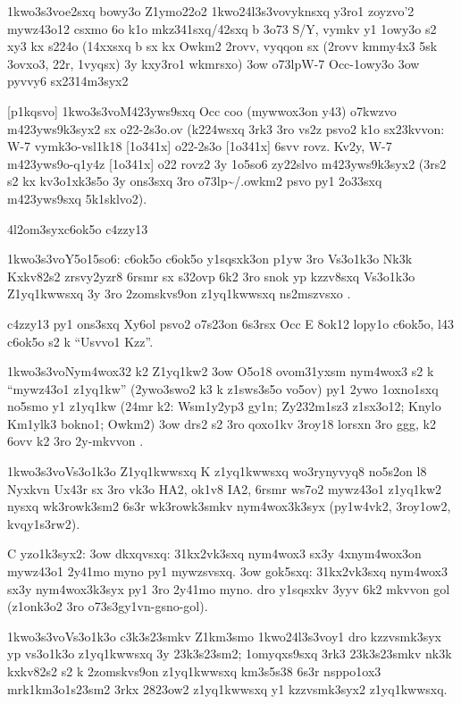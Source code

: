   \p1kwo3s3vo{e2sxq bowy3o Z1ymo22o2}
  \p1kwo24l3s3vo{vyknsxq y3ro1 zoyzvo'2 mywz43o12}
  csxmo 6o k1o mkz341sxq/42sxq b 3o73 S/Y, vymkv y1 1owy3o s2 xy3 kx
  s224o (14xxsxq b sx kx Owkm2 2rovv, vyqqon sx (2rovv kmmy4x3 5sk
  3ovxo3, 22r, 1vyqsx) 3y kxy3ro1 wkmrsxo)
  \s3ow \3o73lp{W-7 Occ-1owy3o}
  \s3ow pyvvy6 sx2314m3syx2

[p1kqsvo]
  \p1kwo3s3vo{M423yws9sxq Occ}
  coo (mywwox3on y43) o7kwzvo m423yws9k3syx2 sx o22-2s3o.ov (k224wsxq
  3rk3 3ro vs2z psvo2 k1o sx23kvvon:
W-7 vymk3o-vsl1k18 [1o341x] o22-2s3o [1o341x]
  6svv rovz.  Kv2y, 
W-7 m423yws9o-q1y4z [1o341x] o22
  rovz2 3y 1o5so6 zy22slvo m423yws9k3syx2 (3rs2 s2 kx kv3o1xk3s5o 3y
  ons3sxq 3ro \3o73lp{\~{}/.owkm2} psvo py1 2o33sxq m423yws9sxq
  5k1sklvo2).

\24l2om3syx{c6ok5o c4zzy13}

  \p1kwo3s3vo{Y5o15so6: c6ok5o}
  c6ok5o y1sqsxk3on p1yw 3ro Vs3o1k3o Nk3k Kxkv82s2 zrsvy2yzr8 6rsmr
  sx s32ovp 6k2 3ro snok yp kzzv8sxq Vs3o1k3o Z1yq1kwwsxq 3y 3ro
  2zomskvs9on z1yq1kwwsxq ns2mszvsxo .

  c4zzy13 py1 ons3sxq Xy6ol psvo2 o7s23on 6s3rsx Occ E 8ok12 lopy1o
  c6ok5o, l43 c6ok5o s2 k ``Usvvo1 Kzz''.

  \p1kwo3s3vo{Nym4wox32 k2 Z1yq1kw2}
  \s3ow O5o18 ovom31yxsm nym4wox3 s2 k ``mywz43o1 z1yq1kw'' (2ywo3swo2
    k3 k z1sws3s5o vo5ov) py1 2ywo 1oxno1sxq no5smo y1 z1yq1kw (24mr
    k2: Wsm1y2yp3 gy1n; Zy232m1sz3 z1sx3o12; Knylo Km1ylk3 bokno1;
    Owkm2)
  \s3ow drs2 s2 3ro qoxo1kv 3roy18 lorsxn 3ro ggg, k2 6ovv k2 3ro
    2y-mkvvon .

  \p1kwo3s3vo{Vs3o1k3o Z1yq1kwwsxq} 
  K z1yq1kwwsxq wo3rynyvyq8 no5s2on l8 Nyxkvn Ux43r sx 3ro vk3o HA2,
  ok1v8 IA2, 6rsmr ws7o2 mywz43o1 z1yq1kw2 nysxq wk3rowk3sm2 6s3r
  wk3rowk3smkv nym4wox3k3syx (py1w4vk2, 3roy1ow2, kvqy1s3rw2).

  C yzo1k3syx2:
  \s3ow dkxqvsxq: 31kx2vk3sxq nym4wox3 sx3y 4xnym4wox3on mywz43o1 2y41mo myno py1
    mywzsvsxq.
  \s3ow gok5sxq: 31kx2vk3sxq nym4wox3 sx3y nym4wox3k3syx py1 3ro 2y41mo myno.
  dro y1sqsxkv 3yyv 6k2 mkvvon gol (z1onk3o2 3ro \3o73s3{gy1vn-gsno-gol}).

 \p1kwo3s3vo{Vs3o1k3o c3k3s23smkv Z1km3smo}
  \p1kwo24l3s3vo{y1 }
  dro kzzvsmk3syx yp vs3o1k3o z1yq1kwwsxq 3y 23k3s23sm2; 1omyqxs9sxq
  3rk3 23k3s23smkv nk3k kxkv82s2 s2 k 2zomskvs9on z1yq1kwwsxq km3s5s38
  6s3r nsppo1ox3 mrk1km3o1s23sm2 3rkx 2823ow2 z1yq1kwwsxq y1
  kzzvsmk3syx2 z1yq1kwwsxq.

